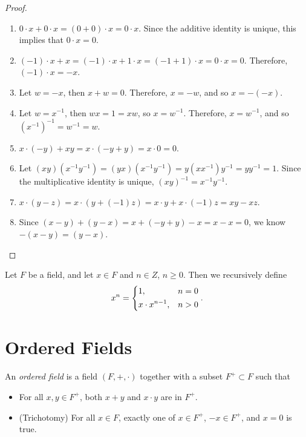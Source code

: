 \begin{proof}\proofbreak
    \begin{enumerate}
        \item $0 \cdot x + 0 \cdot x = (0 + 0) \cdot x = 0 \cdot x$. Since the additive identity is unique, this implies that $0 \cdot x = 0$.
        \item $(-1) \cdot x + x = (-1) \cdot x + 1 \cdot x = (-1 + 1) \cdot x = 0 \cdot x = 0$. Therefore, $(-1) \cdot x = -x$.
        \item Let $w = -x$, then $x + w = 0$. Therefore, $x = -w$, and so $x = -(-x)$.
        \item Let $w = x^{-1}$, then $wx = 1 = xw$, so $x = w^{-1}$. Therefore, $x = w^{-1}$, and so $(x^{-1})^{-1} = w^{-1} = w$.
        \item $x \cdot (-y) + xy = x\cdot(-y + y) = x\cdot 0 = 0$.
        \item Let $(xy)(x^{-1}y^{-1}) = (yx)(x^{-1}y^{-1}) = y(xx^{-1})y^{-1} = yy^{-1} = 1$. Since the multiplicative identity is unique, $(xy)^{-1} = x^{-1}y^{-1}$.
        \item $x \cdot (y-z) = x \cdot (y + (-1)z) = x\cdot y + x \cdot (-1)z = xy - xz$.
        \item Since $(x - y) + (y-x) = x + (-y + y) - x = x - x = 0$, we know $-(x - y) = (y - x)$.
    \end{enumerate}
\end{proof}

\begin{defn}
    Let $F$ be a field, and let $x \in F$ and $n \in Z$, $n \geq 0$. Then we recursively define
    \[x^n =
        \begin{dcases}
            1, & n = 0 \\
            x \cdot x^{n-1}, & n > 0
        \end{dcases}.
    \]
\end{defn}

\section{Ordered Fields}

\begin{defn}
    An \emph{ordered field} is a field $(F, +, \cdot)$ together with a subset $F^+ \subset F$ such that\begin{itemize}
        \item For all $x, y \in F^+$, both $x + y$ and $x \cdot y$ are in $F^+$.
        \item (Trichotomy) For all $x \in F$, exactly one of $x \in F^+$, $-x \in F^+$, and $x = 0$ is true.
    \end{itemize}
\end{defn}


